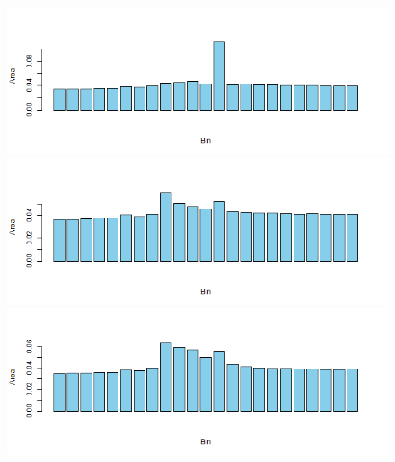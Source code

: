 \documentclass[11pt]{article}
\theoremstyle{plain}
\theoremstyle{definition}
\begin{document}
\begin{figure}[H]
\begin{center}
\includegraphics[trim ={3.5cm 2.7cm 2cm 2cm},scale=.6, clip=true]{Binned_Areas22.png}
\includegraphics[trim ={3.5cm 2.7cm 2cm 2cm},scale=.6, clip=true]{Binned_Areas23.png}
\includegraphics[trim ={3.5cm 2.7cm 2cm 2cm},scale=.6, clip=true]{Binned_Areas24.png}
\end{center}
\end{figure}
\end{document}
